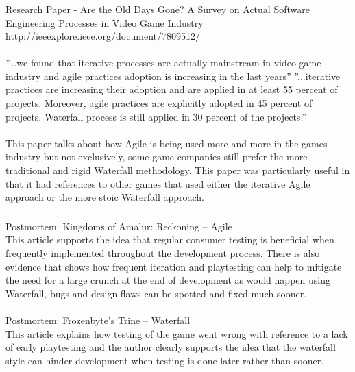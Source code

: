 \documentclass{beamer}
\begin{document}
\begin{frame}
\frametitle{}
Research Paper - Are the Old Days Gone? A Survey on Actual Software Engineering Processes in Video Game Industry
\\http://ieeexplore.ieee.org/document/7809512/\\~\\

''...we found that iterative processes are actually mainstream in video game industry and agile practices adoption is increasing in the last years''
''...iterative practices are increasing their adoption and are applied in at least 55 percent of projects. Moreover, agile practices are explicitly adopted in 45 percent of projects. Waterfall process is still applied in 30 percent of the projects.''
\\~\\
This paper talks about how Agile is being used more and more in the games industry but not exclusively, some game companies still prefer the more traditional and rigid Waterfall methodology. This paper was particularly useful in that it had references to other games that used either the iterative Agile approach or the more stoic Waterfall approach.
\end{frame}

\begin{frame}
\frametitle{}
Postmortem: Kingdoms of Amalur: Reckoning – Agile\\

This article supports the idea that regular consumer testing is beneficial when frequently implemented throughout the development process. There is also evidence that shows how frequent iteration and playtesting can help to mitigate the need for a large crunch at the end of development as would happen using Waterfall, bugs and design flaws can be spotted and fixed much sooner.
\\~\\
Postmortem: Frozenbyte's Trine – Waterfall\\

This article explains how testing of the game went wrong with reference to a lack of early playtesting and the author clearly supports the idea that the waterfall style can hinder development when testing is done later rather than sooner.
\end{frame}
\end{document}
